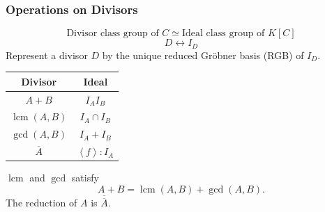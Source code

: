 \documentclass{beamer}
\newcommand{\pid}[1]{\left\langle #1 \right\rangle}
\DeclareMathOperator{\lcm}{lcm}
\renewcommand{\bar}{\overline}
\begin{document}
\begin{frame}
\frametitle{Operations on Divisors}
  \[ \text{Divisor class group of $C$} \simeq \text{Ideal class group of $K[C]$}\]
  \[ D \longleftrightarrow I_D \]
  Represent a divisor $D$ by the unique reduced Gr\"obner basis (RGB) of $I_D$. \\
  \begin{center}
    \begin{tabular}{c|c}
      Divisor & Ideal \\
      \hline
      $A + B$ & $I_A I_B$ \\
      $\lcm(A,B)$ & $I_A \cap I_B$ \\
      $\gcd(A,B)$ & $I_A + I_B$ \\
      $\bar A$ & $\pid{f} : I_A$
    \end{tabular}
  \end{center}
  $\lcm$ and $\gcd$ satisfy
  \[ A + B = \lcm(A, B) + \gcd(A, B). \]
  The reduction of $A$ is $\bar{\bar A}$.
\end{frame}

\end{document}
